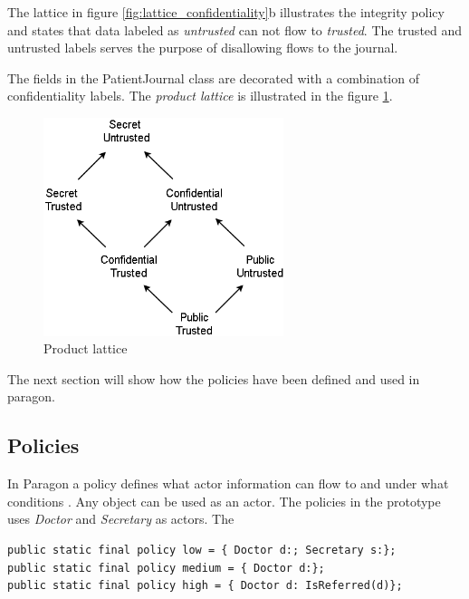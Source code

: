 The lattice in figure \ref{fig:lattice_confidentiality}b illustrates the integrity policy and states that data labeled as \emph{untrusted} can not flow to \emph{trusted}. The trusted and untrusted labels serves the purpose of disallowing flows to the journal.

The fields in the PatientJournal class are decorated with a combination of confidentiality labels. The \emph{product lattice} is illustrated in the figure \ref{fig:lattice_product}.

\begin{figure}[H] 
	\centering
	\includegraphics[width=7cm]{figures/lattice_product.png}
	\caption{Product lattice}
	\label{fig:lattice_product}
\end{figure}


The next section will show how the policies have been defined and used in paragon. 



\subsection{Policies}\label{policies} 

In Paragon a policy defines what actor information can flow to and under what conditions 
\cite{paragonprogramming}. Any object can be used as an actor. The policies in the prototype uses \emph{Doctor} and \emph{Secretary} as actors. The 




\begin{lstlisting}
public static final policy low = { Doctor d:; Secretary s:};
public static final policy medium = { Doctor d:};
public static final policy high = { Doctor d: IsReferred(d)};
\end{lstlisting}



